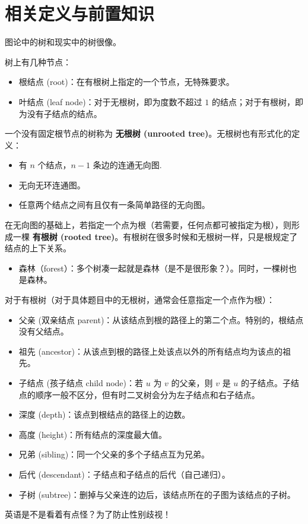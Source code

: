 \documentclass[11pt,oneside,a4paper,UTF8]{book}
\begin{document}
	\section{相关定义与前置知识}
	图论中的树和现实中的树很像。\par
	树上有几种节点：
	\begin{itemize}
		\item 根结点 (root)：在有根树上指定的一个节点，无特殊要求。
		\item 叶结点 (leaf node)：对于无根树，即为度数不超过 $1$ 的结点；对于有根树，即为没有子结点的结点。
	\end{itemize}\par
	一个没有固定根节点的树称为 \textbf{无根树 (unrooted tree)}。无根树也有形式化的定义：
	\begin{itemize}
		\item 有 $n$ 个结点，$n-1$ 条边的连通无向图.
		\item 无向无环连通图。
		\item 任意两个结点之间有且仅有一条简单路径的无向图。
	\end{itemize}\par
	在无向图的基础上，若指定一个点为根（若需要，任何点都可被指定为根），则形成一棵 \textbf{有根树 (rooted tree)}。有根树在很多时候和无根树一样，只是根规定了结点的上下关系。\par
	\begin{itemize}
		\item 森林（forest）：多个树凑一起就是森林（是不是很形象？）。同时，一棵树也是森林。
	\end{itemize}
	对于有根树（对于具体题目中的无根树，通常会任意指定一个点作为根）：
	\begin{itemize}
		\item 父亲 (双亲结点 parent)：从该结点到根的路径上的第二个点。特别的，根结点没有父结点。
		\item 祖先 (ancestor)：从该点到根的路径上处该点以外的所有结点均为该点的祖先。
		\item 子结点 (孩子结点 child node)：若 $u$ 为 $v$ 的父亲，则 $v$ 是 $u$ 的子结点。子结点的顺序一般不区分，但有时二叉树会分为左子结点和右子结点。
		\item 深度 (depth)：该点到根结点的路径上的边数。
		\item 高度 (height)：所有结点的深度最大值。
		\item 兄弟 (sibling)：同一个父亲的多个子结点互为兄弟。
		\item 后代 (descendant)：子结点和子结点的后代（自己递归）。
		\item 子树 (subtree)：删掉与父亲连的边后，该结点所在的子图为该结点的子树。
	\end{itemize}
	英语是不是看着有点怪？为了防止性别歧视！
	
\end{document}
